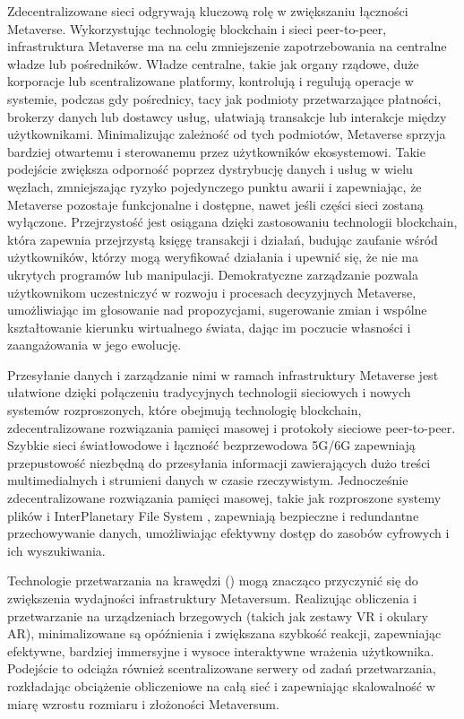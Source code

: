 Zdecentralizowane sieci odgrywają kluczową rolę w zwiększaniu łączności Metaverse. Wykorzystując technologię blockchain i sieci peer-to-peer, infrastruktura Metaverse ma na celu zmniejszenie zapotrzebowania na centralne władze lub pośredników. Władze centralne, takie jak organy rządowe, duże korporacje lub scentralizowane platformy, kontrolują i regulują operacje w systemie, podczas gdy pośrednicy, tacy jak podmioty przetwarzające płatności, brokerzy danych lub dostawcy usług, ułatwiają transakcje lub interakcje między użytkownikami. Minimalizując zależność od tych podmiotów, Metaverse sprzyja bardziej otwartemu i sterowanemu przez użytkowników ekosystemowi. Takie podejście zwiększa odporność poprzez dystrybucję danych i usług w wielu węzłach, zmniejszając ryzyko pojedynczego punktu awarii i zapewniając, że Metaverse pozostaje funkcjonalne i dostępne, nawet jeśli części sieci zostaną wyłączone. Przejrzystość jest osiągana dzięki zastosowaniu technologii blockchain, która zapewnia przejrzystą księgę transakcji i działań, budując zaufanie wśród użytkowników, którzy mogą weryfikować działania i upewnić się, że nie ma ukrytych programów lub manipulacji. Demokratyczne zarządzanie pozwala użytkownikom uczestniczyć w rozwoju i procesach decyzyjnych Metaverse, umożliwiając im głosowanie nad propozycjami, sugerowanie zmian i wspólne kształtowanie kierunku wirtualnego świata, dając im poczucie własności i zaangażowania w jego ewolucję\cite{metaverseInfrastructureIEEE}.

Przesyłanie danych i zarządzanie nimi w ramach infrastruktury Metaverse jest ułatwione dzięki połączeniu tradycyjnych technologii sieciowych i nowych systemów rozproszonych, które obejmują technologię blockchain, zdecentralizowane rozwiązania pamięci masowej i protokoły sieciowe peer-to-peer. Szybkie sieci światłowodowe i łączność bezprzewodowa 5G/6G zapewniają przepustowość niezbędną do przesyłania informacji zawierających dużo treści multimedialnych i strumieni danych w czasie rzeczywistym. Jednocześnie zdecentralizowane rozwiązania pamięci masowej, takie jak rozproszone systemy plików i InterPlanetary File System , zapewniają bezpieczne i redundantne przechowywanie danych, umożliwiając efektywny dostęp do zasobów cyfrowych i ich wyszukiwania\cite{metaverseInfrastructureIEEE}.

Technologie przetwarzania na krawędzi () mogą znacząco przyczynić się do zwiększenia wydajności infrastruktury Metaversum. Realizując obliczenia i przetwarzanie na urządzeniach brzegowych (takich jak zestawy VR i okulary AR), minimalizowane są opóźnienia i zwiększana szybkość reakcji, zapewniając efektywne, bardziej immersyjne i wysoce interaktywne wrażenia użytkownika. Podejście to odciąża również scentralizowane serwery od zadań przetwarzania, rozkładając obciążenie obliczeniowe na całą sieć i zapewniając skalowalność w miarę wzrostu rozmiaru i złożoności Metaversum\cite{metaverseInfrastructureIEEE}.

